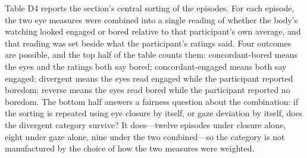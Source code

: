 % 

Table D4 reports the section's central sorting of the episodes. For each episode, the two eye
measures were combined into a single reading of whether the body's watching looked engaged or
bored relative to that participant's own average, and that reading was set beside what the
participant's ratings said. Four outcomes are possible, and the top half of the table counts
them: concordant-bored means the eyes and the ratings both say bored; concordant-engaged
means both say engaged; divergent means the eyes read engaged while the participant reported
boredom; reverse means the eyes read bored while the participant reported no boredom. The
bottom half answers a fairness question about the combination: if the sorting is repeated
using eye closure by itself, or gaze deviation by itself, does the divergent category
survive? It does---twelve episodes under closure alone, eight under gaze alone, nine under
the two combined---so the category is not manufactured by the choice of how the two measures
were weighted.

% 

%

